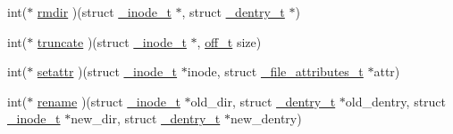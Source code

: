 \begin{DoxyCompactItemize}
int($\ast$ \hyperlink{struct__fs__instance__t_a4ceb71ff00d0a5fda03aa644c4694bef}{rmdir} )(struct \hyperlink{struct__inode__t}{\-\_\-inode\-\_\-t} $\ast$, struct \hyperlink{struct__dentry__t}{\-\_\-dentry\-\_\-t} $\ast$)
\item 
int($\ast$ \hyperlink{struct__fs__instance__t_a02c8b56a14997bf58d8350a26e441954}{truncate} )(struct \hyperlink{struct__inode__t}{\-\_\-inode\-\_\-t} $\ast$, \hyperlink{libc_2include_2sys_2types_8h_a447a6a64dbb8fb44b1e62856b333db4a}{off\-\_\-t} size)
\item 
int($\ast$ \hyperlink{struct__fs__instance__t_ae76a7f1f9c4653baa497343bf26918a6}{setattr} )(struct \hyperlink{struct__inode__t}{\-\_\-inode\-\_\-t} $\ast$inode, struct \hyperlink{struct__file__attributes__t}{\-\_\-file\-\_\-attributes\-\_\-t} $\ast$attr)
\item 
int($\ast$ \hyperlink{struct__fs__instance__t_a62e37513c47dda9d11e534cf84d6f48b}{rename} )(struct \hyperlink{struct__inode__t}{\-\_\-inode\-\_\-t} $\ast$old\-\_\-dir, struct \hyperlink{struct__dentry__t}{\-\_\-dentry\-\_\-t} $\ast$old\-\_\-dentry, struct \hyperlink{struct__inode__t}{\-\_\-inode\-\_\-t} $\ast$new\-\_\-dir, struct \hyperlink{struct__dentry__t}{\-\_\-dentry\-\_\-t} $\ast$new\-\_\-dentry)
\end{DoxyCompactItemize}


